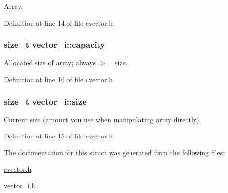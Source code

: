 Array. 



Definition at line 14 of file cvector.\-h.

\hypertarget{structvector__i_a8e7421832635519ee2ccebd19298b705}{
\subsubsection[{capacity}]{\setlength{\rightskip}{0pt plus 5cm}size\-\_\-t vector\-\_\-i\-::capacity}}\label{structvector__i_a8e7421832635519ee2ccebd19298b705}


Allocated size of array; always $>$= size. 



Definition at line 16 of file cvector.\-h.

\hypertarget{structvector__i_a8df52068982f4b7dcaa024b37f243282}{
\subsubsection[{size}]{\setlength{\rightskip}{0pt plus 5cm}size\-\_\-t vector\-\_\-i\-::size}}\label{structvector__i_a8df52068982f4b7dcaa024b37f243282}


Current size (amount you use when manipulating array directly). 



Definition at line 15 of file cvector.\-h.



The documentation for this struct was generated from the following files\-:\begin{DoxyCompactItemize}
\item 
\hyperlink{cvector_8h}{cvector.\-h}\item 
\hyperlink{vector__i_8h}{vector\-\_\-i.\-h}\end{DoxyCompactItemize}
